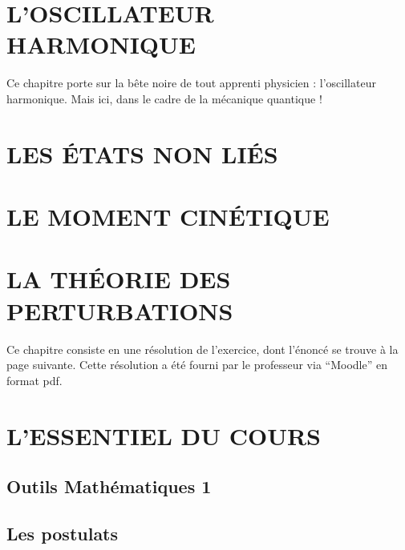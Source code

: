 \documentclass[12pt,a4paper,titlepage]{book}
\begin{document}
\chapter{L'OSCILLATEUR HARMONIQUE}

Ce chapitre porte sur la bête noire de tout apprenti physicien : l'oscillateur harmonique. Mais ici, dans le cadre de la mécanique quantique !

\newpage

\newpage


\chapter{LES ÉTATS NON LIÉS}

\newpage


\chapter{LE MOMENT CINÉTIQUE}

\newpage

\newpage

\newpage


\chapter{LA THÉORIE DES PERTURBATIONS}

Ce chapitre consiste en une résolution de l'exercice, dont l'énoncé se trouve à la page suivante. Cette résolution a été fourni par le professeur via \enquote{Moodle} en format pdf.

\newpage


\chapter{L'ESSENTIEL DU COURS}

\section{Outils Mathématiques 1}

\section{Les postulats}
\end{document}
